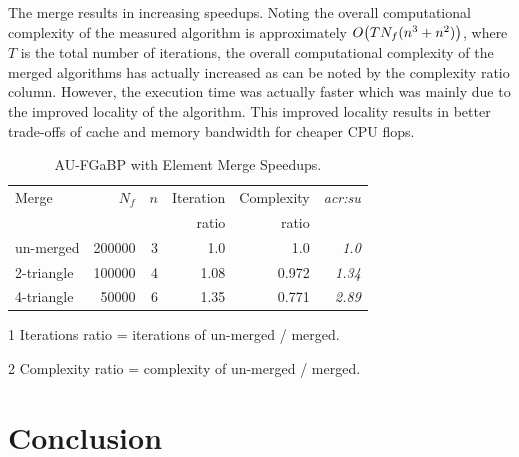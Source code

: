 The merge results in increasing speedups.
Noting the overall computational complexity of the measured algorithm is approximately $ O\bigl(TN_f(n^3 + n^2)\bigr)$, where $T$ is the total number of iterations, the overall computational complexity of the merged algorithms has actually increased as can be noted by the complexity ratio column.
However, the execution time was actually faster which was mainly due to the improved locality of the algorithm. 
This improved locality results in better trade-offs of cache and memory bandwidth for cheaper CPU flops.

\begin{table}
	\centering
	\begin{threeparttable}
		\caption{AU-FGaBP with Element Merge Speedups.} \label{tbl:fgabpMerge}
		\begin{tabular}{lrrrr>{\itshape}r} \toprule
			Merge       & $N_f$  & $n$ & Iteration      & Complexity     & \gls{acr:su} \tabularnewline
			&        &      & ratio\tnote{1} & ratio\tnote{2} & \tabularnewline
			\midrule
			un-merged   & 200000 & 3    & 1.0            & 1.0            & 1.0 \tabularnewline
			2-triangle  & 100000 & 4    & 1.08           & 0.972          & 1.34 \tabularnewline
			4-triangle  & 50000  & 6    & 1.35           & 0.771          & 2.89 \tabularnewline
			\bottomrule
		\end{tabular}
		\begin{tablenotes}
			\begin{footnotesize}
			\item[1] {Iterations ratio = iterations of un-merged / merged.}
			\item[2] {Complexity ratio = complexity of un-merged / merged.}
			\end{footnotesize}
		\end{tablenotes}
	\end{threeparttable}
\end{table}


\section{Conclusion}
\label{sec_conclusion}

